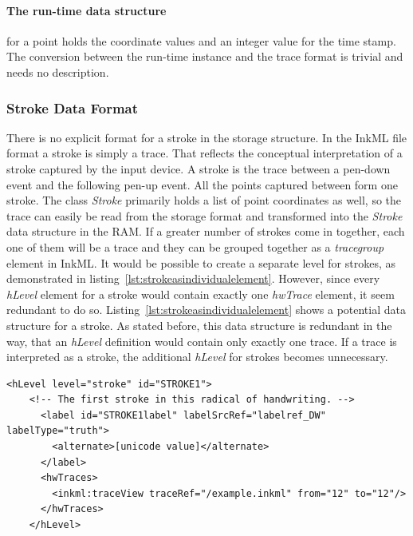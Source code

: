 \paragraph{The run-time data structure} for a point holds the coordinate values 
and an integer value for the time stamp. The conversion between the run-time 
instance and the trace format is trivial and needs no description.

\subsubsection{Stroke Data Format}
\label{sec:hwre:strokedataformat}

There is no explicit format for a stroke in the storage structure.
In the InkML file format a stroke is simply a trace. That reflects the
conceptual interpretation of a stroke captured by the input device.
A stroke is the trace between a pen-down event and the following pen-up
event. All the points captured between form one stroke.
The class \emph{Stroke} primarily holds a list of point coordinates
as well, so the trace can easily be read from the storage format and 
transformed into the \emph{Stroke} data structure in the RAM.
If a greater number of strokes come in together, each one of them will be a trace
and they can be grouped together as a \emph{tracegroup} element in InkML.
It would be possible to create a separate level for strokes, as demonstrated
in listing~\ref{lst:strokeasindividualelement}. However, since every 
\emph{hLevel} element for a stroke would contain exactly one \emph{hwTrace} 
element, it seem redundant to do so.
Listing~\ref{lst:strokeasindividualelement} shows a potential data structure
for a stroke. As stated before, this data structure is redundant in the way, 
that an \emph{hLevel} definition would contain only exactly one trace.
If a trace is interpreted as a stroke, the additional \emph{hLevel} for strokes
becomes unnecessary.

\begin{xmlcode}
  \begin{lstlisting}[emph={hLevel,hwTraces,label,alternative},
                     emphstyle=\color{blue}\textbf,
                     emph={[2]level,labelSrcRef,labelType,traceRef,from,to},
                     emphstyle={[2]\color{red}},
                     caption={An example of how a stroke could be 
                              represented in UPX},
                     label=lst:strokeasindividualelement]
    <hLevel level="stroke" id="STROKE1">
    <!-- The first stroke in this radical of handwriting. -->
      <label id="STROKE1label" labelSrcRef="labelref_DW" labelType="truth">
        <alternate>[unicode value]</alternate>
      </label>
      <hwTraces>
        <inkml:traceView traceRef="/example.inkml" from="12" to="12"/>
      </hwTraces>
    </hLevel>
  \end{lstlisting}
\end{xmlcode}

